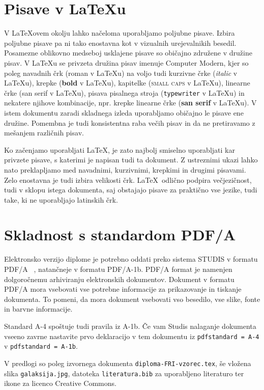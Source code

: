 \documentclass[a4paper,12pt,openright]{book}
\begin{document}
\section{Pisave v \LaTeX u}

V  \LaTeX ovem okolju lahko načeloma uporabljamo poljubne pisave.
Izbira poljubne pisave pa ni tako enostavna kot v vizualnih urejevalnikih besedil.
Posamezne oblikovno medseboj usklajene pisave so običajno združene v družine pisav.
V \LaTeX u se privzeta družina pisav imenuje Computer Modern,
kjer so poleg navadnih črk (roman v \LaTeX u) na voljo tudi kurzivne črke (\textit{italic} v \LaTeX u),
krepke (\textbf{bold} v \LaTeX u), kapitelke (\textsc{small caps} v \LaTeX u), linearne črke ({\textsf{san serif} v \LaTeX u}), pisava pisalnega stroja (\texttt{typewriter} v \LaTeX u) in nekatere njihove kombinacije, npr. krepke linearne črke
({\textbf{\textsf{san serif}} v \LaTeX u}).
V istem dokumentu zaradi skladnega izleda uporabljamo običajno le pisave ene družine.
Pomembna je tudi konsistentna raba večih pisav in da ne pretiravamo z mešanjem različnih pisav.

Ko začenjamo uporabljati \LaTeX, je zato najbolj smiselno uporabljati kar privzete pisave, s katerimi je napisan tudi ta dokument.
Z ustreznimi ukazi  lahko nato preklapljamo med navadnimi, kurzivnimi, krepkimi in drugimi pisavami.
Zelo enostavna je tudi izbira velikosti črk.
\LaTeX\  odlično podpira večjezičnost, tudi v sklopu istega dokumenta, saj obstajajo pisave za praktično vse jezike, tudi take, ki ne uporabljajo latinskih črk.

\section{Skladnost s standardom PDF/A}

Elektronsko verzijo diplome je potrebno oddati preko sistema STUDIS v formatu PDF/A ~\cite{howtopdfa,pdfa},
natančneje v formatu PDF/A-1b.
PDF/A format je namenjen dolgoročnemu arhiviranju elektronskih dokumentov.
Dokument v formatu PDF/A mora vsebovati vse potrebne informacije za prikazovanje in tiskanje dokumenta. To pomeni, da mora dokument  vsebovati vso besedilo, vse slike, fonte in barvne informacije.

Standard A-4 spoštuje tudi pravila iz A-1b. Če vam Studis nalaganje dokumenta vseeno zavrne nastavite prvo deklaracijo v tem dokumentu iz \texttt{pdfstandard = A-4} v \texttt{pdfstandard = A-1b}.

V predlogi so poleg izvornega  dokumenta \texttt{diploma-FRI-vzorec.tex}, še vložena slika \texttt{galaksija.jpg}, datoteka \texttt{literatura.bib} za uporabljeno literaturo  ter
ikone za licenco Creative Commons.
\end{document}
